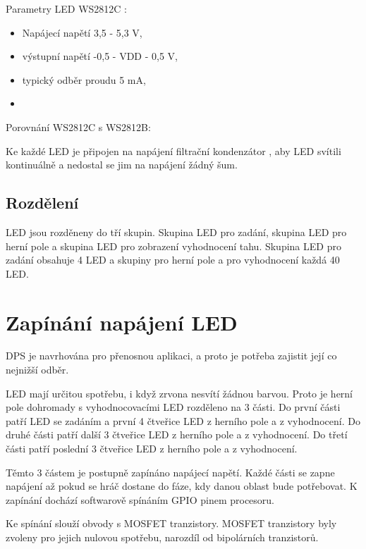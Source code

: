 Parametry LED WS2812C \cite{WS2812C_datasheet}: %
\begin{itemize}
    \item Napájecí napětí 3,5 - 5,3 V,
    \item výstupní napětí -0,5 - VDD - 0,5 V,
    \item typický odběr proudu 5 mA,
    \item 
\end{itemize}

Porovnání WS2812C s WS2812B:

Ke každé LED je připojen na napájení filtrační kondenzátor \cite{WS2812C_datasheet}, aby LED svítili kontinuálně a nedostal se 
jim na napájení žádný šum.

\subsection{Rozdělení}
LED jsou rozděneny do tří skupin. Skupina LED pro zadání, skupina LED pro herní pole a skupina LED pro zobrazení vyhodnocení 
tahu.
Skupina LED pro zadání obsahuje 4 LED a skupiny pro herní pole a pro vyhodnocení každá 40 LED.

\section{Zapínání napájení LED}
DPS je navrhována pro přenosnou aplikaci, a proto je potřeba zajistit její co nejnižší odběr. 

LED mají určitou spotřebu, i když zrvona nesvítí žádnou barvou. Proto je herní pole dohromady s vyhodnocovacími LED rozděleno 
na 3 části. Do první části patří LED se zadáním a první 4 čtveřice LED z herního pole a z vyhodnocení. Do druhé části patří 
další 3 čtveřice LED z herního pole a z vyhodnocení. Do třetí části patří poslední 3 čtveřice LED z herního pole a z 
vyhodnocení.

Těmto 3 částem je postupně zapínáno napájecí napětí. Každé části se zapne napájení až pokud se hráč dostane do fáze, kdy 
danou oblast bude potřebovat. K zapínání dochází softwarově spínáním GPIO pinem procesoru.

Ke spínání slouží obvody s MOSFET tranzistory. MOSFET tranzistory byly zvoleny pro jejich nulovou spotřebu, narozdíl od 
bipolárních tranzistorů. 

